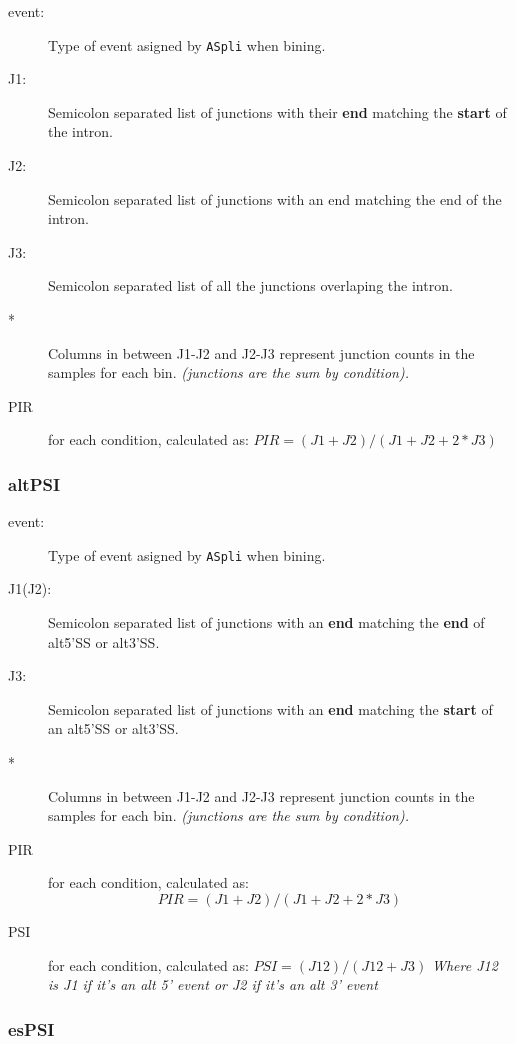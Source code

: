 \documentclass{article}
\begin{document}
\begin{description}
\item [event:] Type of event asigned by \texttt{ASpli} when bining. 
\item [J1:] Semicolon separated list of junctions with their \textbf{end} matching the \textbf{start} of the intron. 
\item [J2:] Semicolon separated list of junctions with an end matching the end of the intron. 
\item [J3:] Semicolon separated list of all the junctions overlaping the intron.
\item [*] Columns in between J1-J2 and J2-J3 represent junction counts in the samples for each bin. \textit{(junctions are the sum by condition).}
\item [PIR]   for each condition, calculated as: $ PIR = (J1 + J2)/(J1 + J2 + 2*J3) $
\end{description}

\subsubsection*{altPSI}
\begin{description}
\item [event:] Type of event asigned by \texttt{ASpli} when bining. 
\item [J1(J2):] Semicolon separated list of junctions with an \textbf{end} matching the \textbf{end} of alt5'SS or alt3'SS. 
\item [J3:] Semicolon separated list of junctions with an \textbf{end} matching the \textbf{start} of an alt5'SS or alt3'SS. 

\item [*] Columns in between J1-J2 and J2-J3 represent junction counts in the samples for each bin. \textit{(junctions are the sum by condition).}
\item [PIR] for each condition, calculated as: $$ PIR = (J1 + J2)/(J1 + J2 + 2*J3) $$
\item [PSI] for each condition, calculated as: $ PSI = (J12)/(J12 + J3)$
\textit{Where J12 is J1 if it's an alt 5' event or J2 if it's an alt 3' event}
\end{description}

\subsubsection*{esPSI}
\end{document}
